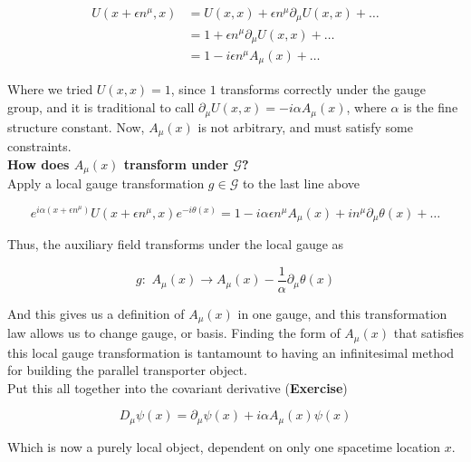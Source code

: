 \begin{align}
U(x + \epsilon n^\mu , x) &= U (x,x) + \epsilon n^\mu \partial_\mu U(x,x) + \dots \\
&= 1 + \epsilon n^\mu \partial_\mu U(x,x) +\dots \\
&= 1 - i \epsilon n^\mu A_\mu (x) + \dots
\end{align}

\noindent Where we tried $U(x,x)=1$, since $1$ transforms correctly under the gauge group, and it is traditional to call $\partial_\mu U(x,x) = -i \alpha A_\mu (x)$, where $\alpha$ is the fine structure constant. Now, $A_\mu (x)$ is not arbitrary, and must satisfy some constraints. \\

\noindent \textbf{How does $A_\mu (x)$ transform under $\mathcal{G}$?} \\

\noindent Apply a local gauge transformation $g \in \mathcal{G}$ to the last line above

\begin{equation}
e^{i \alpha (x + \epsilon n^\mu)} U(x + \epsilon n^\mu, x) e^{-i \theta(x)} = 1 - i \alpha \epsilon n^\mu A_\mu (x) + i n^\mu \partial_\mu \theta(x) + \dots
\end{equation}

\noindent Thus, the auxiliary field transforms under the local gauge as

\begin{equation}
g: \,\, A_\mu (x) \rightarrow A_\mu (x) - \frac{1}{\alpha} \partial_\mu \theta (x)
\end{equation}

\noindent And this gives us a definition of $A_\mu (x)$ in one gauge, and this transformation law allows us to change gauge, or basis. Finding the form of $A_\mu (x)$ that satisfies this local gauge transformation is tantamount to having an infinitesimal method for building the parallel transporter object. \\

\noindent Put this all together into the covariant derivative (\textbf{Exercise})

\begin{equation}
D_\mu \psi (x) = \partial_\mu \psi (x) + i \alpha A_\mu (x) \psi (x)
\end{equation}

\noindent Which is now a purely local object, dependent on only one spacetime location $x$. \\

